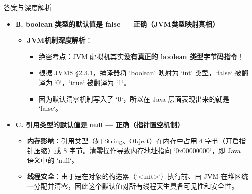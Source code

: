 \documentclass[12pt, a4paper]{ctexart}
\begin{document}
\begin{enumerate}[label=\textbf{\arabic*.}]
\begin{bluebox}{答案与深度解析}
\begin{itemize}[leftmargin=*, nosep]
			      \item \textbf{B. boolean 类型的默认值是 false — 正确（JVM类型映射真相）}
			            \begin{itemize}[leftmargin=*, nosep]
				            \item \textbf{JVM机制深度解析}：
				                  \begin{itemize}
					                  \item 绝密考点：JVM 虚拟机其实\textbf{没有真正的 boolean 类型字节码指令}！
					                  \item 根据 JVMS §2.3.4，编译器将 `boolean` 映射为 `int` 类型，`false` 被翻译为 `0`，`true` 被翻译为 `1`。
					                  \item 因为默认清零机制写入了 `0`，所以在 Java 层面表现出来的就是 `false`。
				                  \end{itemize}
			            \end{itemize}

			      \item \textbf{C. 引用类型的默认值是 null — 正确（指针置空机制）}
			            \begin{itemize}[leftmargin=*, nosep]
				            \item \textbf{内存影响}：引用类型（如 String、Object）在内存中占用 4 字节（开启指针压缩）或 8 字节。清零操作导致内存地址指向 `0x00000000`，即 Java 语义中的 `null`。
				            \item \textbf{线程安全}：由于是在对象的构造器（`<init>`）执行前、由 JVM 在堆区统一分配并清零，因此这个默认值对所有线程天生具备可见性和安全性。
			            \end{itemize}


\end{itemize}
\end{bluebox}
\end{enumerate}
\end{document}
